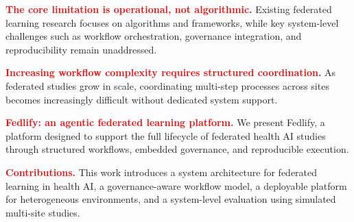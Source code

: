 \documentclass[preprint,5p, 10pt, times]{elsarticle}
\begin{document}
\textcolor{red}{\textbf{The core limitation is operational, not algorithmic.}} Existing federated learning research focuses on algorithms and frameworks, while key system-level challenges such as workflow orchestration, governance integration, and reproducibility remain unaddressed.

\textcolor{red}{\textbf{Increasing workflow complexity requires structured coordination.}} As federated studies grow in scale, coordinating multi-step processes across sites becomes increasingly difficult without dedicated system support.

\textcolor{red}{\textbf{Fedlify: an agentic federated learning platform.}} We present Fedlify, a platform designed to support the full lifecycle of federated health AI studies through structured workflows, embedded governance, and reproducible execution.

\textcolor{red}{\textbf{Contributions.}} This work introduces a system architecture for federated learning in health AI, a governance-aware workflow model, a deployable platform for heterogeneous environments, and a system-level evaluation using simulated multi-site studies.



\end{document}
